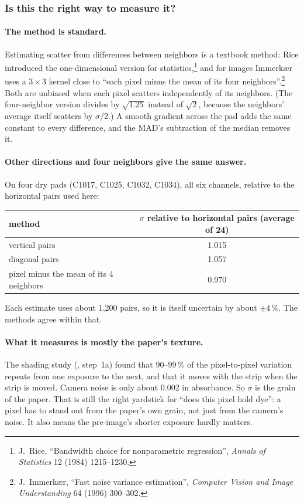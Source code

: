 \documentclass[11pt,letterpaper]{article}
\DeclareRobustCommand{\file}[1]{\texttt{\seqsplit{#1}}}
\begin{document}
\subsubsection{Is this the right way to measure it?}
\label{sec:scatterwhat}

\paragraph{The method is standard.}  Estimating scatter from differences
between neighbors is a textbook method: Rice introduced the one-dimensional
version for statistics,\footnote{J.~Rice, ``Bandwidth choice for
nonparametric regression'', \emph{Annals of Statistics} 12 (1984)
1215--1230.} and for images Immerk{\ae}r uses a $3\times3$ kernel close to
``each pixel minus the mean of its four neighbors''.\footnote{J.~Immerk{\ae}r,
``Fast noise variance estimation'', \emph{Computer Vision and Image
Understanding} 64 (1996) 300--302.}  Both are unbiased when each pixel
scatters independently of its neighbors.  (The four-neighbor version
divides by $\sqrt{1.25}$ instead of $\sqrt2$, because the neighbors' average
itself scatters by $\sigma/2$.)  A smooth gradient across the pad adds the
same constant to every difference, and the MAD's subtraction of the median
removes it.

\paragraph{Other directions and four neighbors give the same answer.}  On
four dry pads (C1017, C1025, C1032, C1034), all six channels, relative to the
horizontal pairs used here:
\begin{center}\small
\begin{tabular}{@{}lc@{}}
\toprule
method & $\sigma$ relative to horizontal pairs (average of 24) \\
\midrule
vertical pairs & 1.015 \\
diagonal pairs & 1.057 \\
pixel minus the mean of its 4 neighbors & 0.970 \\
\bottomrule
\end{tabular}
\end{center}
Each estimate uses about 1{,}200 pairs, so it is itself uncertain by about
$\pm4\,\%$.  The methods agree within that.

\paragraph{What it measures is mostly the paper's texture.}  The shading
study (\file{docs/shading\_study\_2026-09-29.md}, step~1a) found that 90--99\,\%
of the pixel-to-pixel variation repeats from one exposure to the next, and
that it moves with the strip when the strip is moved.  Camera noise is only
about 0.002 in absorbance.  So $\sigma$ is the grain of the paper.  That is
still the right yardstick for ``does this pixel hold dye'': a pixel has to
stand out from the paper's own grain, not just from the camera's noise.  It
also means the pre-image's shorter exposure hardly matters.
\end{document}
